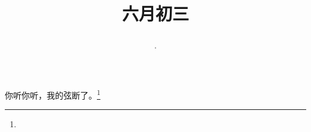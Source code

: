 \title{\date[d=8,m=7,y=2024][year:cn-y,年,month:cn,day:cn,日,·,weekday]·六月初三 }
你听你听，我的弦断了。\footnote{ }

